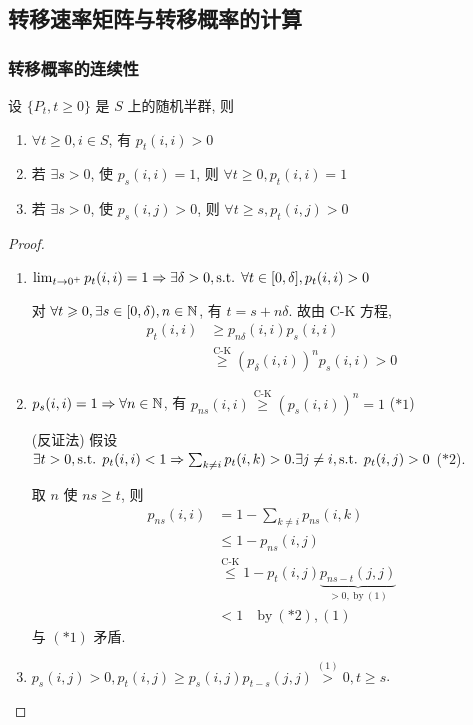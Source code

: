 \subsection{转移速率矩阵与转移概率的计算}
\subsubsection{转移概率的连续性}
\begin{proposition}\label{prop:p122-prop1}
    设 $\{P_t,t\geq 0\}$ 是 $S$ 上的随机半群, 则
    \begin{enumerate}
        \item $\forall t\geq 0,i\in S$, 有 $p_t(i,i)>0$
        \item 若 $\exists s>0$, 使 $p_s(i,i)=1$, 则 $\forall t\geq 0,p_t(i,i)=1$
        \item 若 $\exists s>0$, 使 $p_s(i,j)>0$, 则 $\forall t\geq s,p_t(i,j)>0$
    \end{enumerate}
\end{proposition}

\begin{proof}
\begin{enumerate}
    \item $\lim_{t \to 0^+}p_t(i,i)=1\Rightarrow \exists\delta>0,\text{s.t. } \forall t\in [0,\delta], p_t(i,i)>0$

对 $\forall t\geqslant 0, \exists s\in [0,\delta),n\in \mathbb{N}$, 有 $t=s+n\delta$. 故由 C-K 方程, 
\[
\begin{aligned}
    p_t(i,i) &\geq p_{n\delta}(i,i)p_s(i,i)\\
    &\overset{\text{C-K}}{\geq} (p_{\delta}(i,i))^np_s(i,i)>0
\end{aligned}
\]
    \item $p_s(i,i)=1\Rightarrow \forall n\in \mathbb{N}$, 有 $p_{ns}(i,i)\overset{\text{C-K}}{\geq}(p_s(i,i))^n=1$ ($*1$)
    
    (反证法) 假设 $\exists t>0,\text{s.t. } p_t(i,i)<1\Rightarrow \sum_{k\neq i}p_t(i,k)>0.  \exists j\neq i,\text{s.t. } p_t(i,j)>0$ ($*2$).
    
    取 $n$ 使 $ns\geq t$, 则 
    \[
    \begin{aligned}
        p_{ns}(i,i) &=1-\sum_{k\neq i}p_{ns}(i,k)\\
        &\leq 1-p_{ns}(i,j)\\
        &\overset{\text{C-K}}{\leq} 1-p_t(i,j)\underbrace{p_{ns-t}(j,j)}_{>0,\ \text{by}\ (1)}\\
        &< 1\quad \text{by}\ (*2), (1)
    \end{aligned}
    \]
    与 $(*1)$ 矛盾.
    \item $p_s(i,j)>0,p_t(i,j)\geq p_s(i,j)p_{t-s}(j,j)\overset{(1)}{>}0, t\geq s$.
\end{enumerate}
\end{proof}

